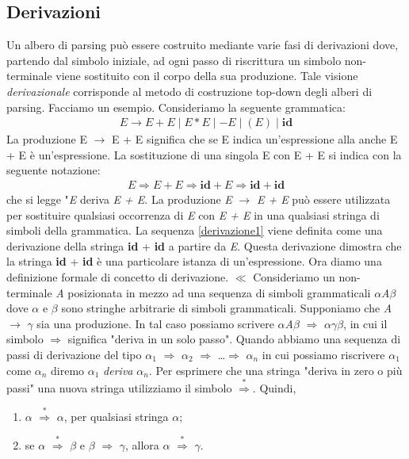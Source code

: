 \subsection{Derivazioni}
Un albero di parsing \cite{libro: compilatori} può essere costruito mediante varie fasi di derivazioni dove, partendo dal simbolo iniziale, ad ogni passo di riscrittura un simbolo non-terminale viene sostituito con il corpo della sua produzione. Tale visione \textit{derivazionale }corrisponde al metodo di costruzione top-down degli alberi di parsing.
Facciamo un esempio. Consideriamo la seguente grammatica:
\begin{align}\label{grammaticaEspressioni}
	E \to E + E \mid E * E \mid - E \mid ( E ) \mid \textbf{id}
\end{align}
La produzione E $\to$ E + E significa che se E indica un'espressione alla anche E + E è un'espressione. La sostituzione di una singola E con E + E si indica con la seguente notazione:
\begin{align}\label{derivazione1}
	E \Rightarrow E + E \Rightarrow \textbf{id} + E \Rightarrow \textbf{id} + \textbf{id}
\end{align}
che si legge "\textit{E} deriva \textit{E + E}. La produzione \textit{E} $\to$ \textit{E + E} può essere utilizzata per sostituire qualsiasi occorrenza di \textit{E} con \textit{E + E} in una qualsiasi stringa di simboli della grammatica. La sequenza \ref{derivazione1} viene definita come una derivazione della stringa \textbf{id }+ \textbf{id} a partire da \textit{E}. Questa derivazione dimostra che la stringa \textbf{id }+ \textbf{id} è una particolare istanza di un'espressione. Ora diamo una definizione formale di concetto di derivazione. $\ll$ Consideriamo un non-terminale \textit{A} posizionata in mezzo ad una sequenza di simboli grammaticali $\alpha$\textit{A}$\beta$ dove $\alpha$ e $\beta$ sono stringhe arbitrarie di simboli grammaticali. Supponiamo che \textit{A} $\to$ $\gamma$ sia una produzione. In tal caso possiamo scrivere $\alpha$\textit{A}$\beta$ $\Rightarrow$ $\alpha$$\gamma$$\beta$, in cui il simbolo $\Rightarrow$ significa "deriva in un solo passo". Quando abbiamo una sequenza di passi di derivazione del tipo $\alpha_{1}$ $\Rightarrow$ $\alpha_{2}$ $\Rightarrow$ \dots $\Rightarrow$ $\alpha_{n}$ in cui possiamo riscrivere $\alpha_{1}$ come $\alpha_{n}$ diremo $\alpha_{1}$ \textit{deriva }$\alpha_{n}$. Per esprimere che una stringa "deriva in zero o più passi" una nuova stringa utilizziamo il simbolo $\overset{*}{\Rightarrow}$. Quindi, 
\begin{enumerate}
	\item $\alpha$ $\overset{*}{\Rightarrow}$ $\alpha$, per qualsiasi stringa $\alpha$;
	\item  se $\alpha$ $\overset{*}{\Rightarrow}$ $\beta$ e $\beta$ $\Rightarrow$ $\gamma$, allora $\alpha$ $\overset{*}{\Rightarrow}$ $\gamma$.
\end{enumerate} 
